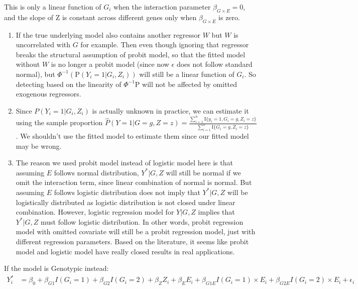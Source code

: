 \documentclass[
]{article}
\begin{document}
This is only a linear function of \(G_i\) when the interaction parameter
\(\beta_{G\times E} = 0\), and the slope of Z is constant across
different genes only when \(\beta_{G\times E}\) is zero.

\begin{enumerate}
\item If the true underlying model also contains another regressor $W$ but $W$ is uncorrelated with $G$ for example. Then even though ignoring that regressor breaks the structural assumption of probit model, so that the fitted model without $W$ is no longer a probit model (since now $\epsilon$ does not follow standard normal), but $\Phi^{-1}(\text{P}(Y_i = 1|G_i,Z_i))$ will still be a linear function of $G_i$. So detecting based on the linearity of $\Phi^{-1}\text{P}$ will not be affected by omitted exogenous regressors.
\item Since $P(Y_i = 1|G_i,Z_i)$ is actually unknown in practice, we can estimate it using the sample proportion $\hat{P}(Y = 1|G = g,Z = z) = \frac{\sum_{i=1}^{n} \text{I}\{y_i =1,G_{i} = g, Z_{i} = z\}}{\sum_{i=1}^{n}  \text{I}\{G_{i} = g, Z_{i} = z\}}$. We shouldn't use the fitted model to estimate them since our fitted model may be wrong.
\item The reason we used probit model instead of logistic model here is that assuming $E$ follows normal distribution, $Y^*|G,Z$ will still be normal if we omit the interaction term, since linear combination of normal is normal. But assuming $E$ follows logistic distribution does not imply that $Y^*|G,Z$ will be logistically distributed as logistic distribution is not closed under linear combination. However, logistic regression model for $Y|G,Z$ implies that $Y^*|G,Z$ must follow logistic distribution. In other words, probit regression model with omitted covariate will still be a probit regression model, just with different regression parameters. Based on the literature, it seems like probit model and logistic model have really closed results in real applications.
\end{enumerate}

If the model is Genotypic instead: \begin{equation}\label{eqn:genointer}
\begin{aligned}
Y_i^* &= \beta_0 + \beta_{G1} I(G_i = 1) + \beta_{G2} I(G_i = 2) + \beta_Z Z_i + \beta_E E_i + \beta_{G1E} I(G_i = 1) \times E_i + \beta_{G2E} I(G_i = 2) \times E_i  + \epsilon_i \\
\end{aligned}
\end{equation}
\end{document}
